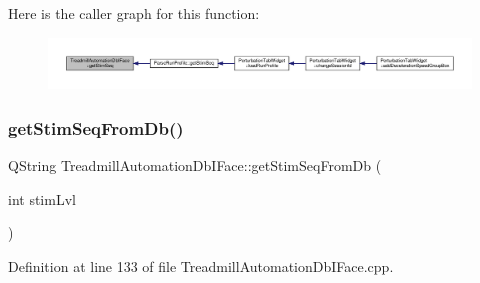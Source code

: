 Here is the caller graph for this function\+:
\nopagebreak
\begin{figure}[H]
\begin{center}
\leavevmode
\includegraphics[width=350pt]{class_treadmill_automation_db_i_face_aba0e5950a23549b5d042368d9e651790_icgraph}
\end{center}
\end{figure}
\mbox{\label{class_treadmill_automation_db_i_face_a97a851c99b7ca8ee21a908d768168052}} 
\subsubsection{\texorpdfstring{get\+Stim\+Seq\+From\+Db()}{getStimSeqFromDb()}}
{\footnotesize\ttfamily Q\+String Treadmill\+Automation\+Db\+I\+Face\+::get\+Stim\+Seq\+From\+Db (\begin{DoxyParamCaption}\item[{int}]{stim\+Lvl }\end{DoxyParamCaption})}



Definition at line 133 of file Treadmill\+Automation\+Db\+I\+Face.\+cpp.

